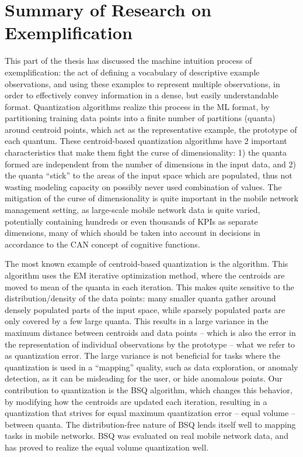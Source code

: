 \chapter{Summary of Research on Exemplification}
	\label{cha:sum_exemplification}
		
	This part of the thesis has discussed the machine intuition process of exemplification: the act of defining a vocabulary of descriptive example observations, and using these examples to represent multiple observations, in order to effectively convey information in a dense, but easily understandable format.
	Quantization algorithms realize this process in the \ac{ML} format, by partitioning training data points into a finite number of partitions (quanta) around centroid points, which act as the representative example, the prototype of each quantum.	
	These centroid-based quantization algorithms have $2$ important characteristics that make them fight the curse of dimensionality: 1) the quanta formed are independent from the number of dimensions in the input data, and 2) the quanta ``stick'' to the areas of the input space which are populated, thus not wasting modeling capacity on possibly never used combination of values.
	The mitigation of the curse of dimensionality is quite important in the mobile network management setting, as large-scale mobile network data is quite varied, potentially containing hundreds or even thousands of \acp{KPI} as separate dimensions, many of which should be taken into account in decisions in accordance to the \ac{CAN} concept of cognitive functions.
	
	The most known example of centroid-based quantization is the \kmeans{} algorithm.
	This algorithm uses the \ac{EM} iterative optimization method, where the centroids are moved to mean of the quanta in each iteration.
	This makes \kmeans{} quite sensitive to the distribution/density of the data points: many smaller quanta gather around densely populated parts of the input space, while sparsely populated parts are only covered by a few large quanta.
	This results in a large variance in the maximum distance between centroids and data points -- which is also the error in the representation of individual observations by the prototype -- what we refer to as quantization error.
	The large variance is not beneficial for tasks where the quantization is used in a ``mapping'' quality, such as data exploration, or anomaly detection, as it can be misleading for the user, or hide anomalous points.
	Our contribution to quantization is the \ac{BSQ} algorithm, which changes this behavior, by modifying how the centroids are updated each iteration, resulting in a quantization that strives for equal maximum quantization error -- equal volume -- between quanta.
	The distribution-free nature of \ac{BSQ} lends itself well to mapping tasks in mobile networks.
	\ac{BSQ} was evaluated on real mobile network data, and has proved to realize the equal volume quantization well.
	
